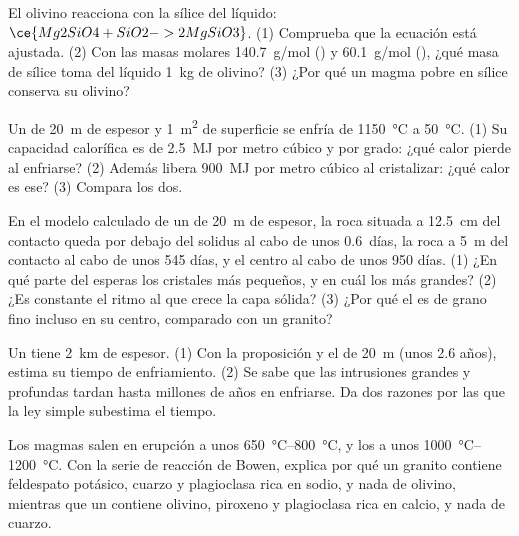 \begin{exercise}[$\star\star$]\label{exo:g11:igneous-rocks:10}
El olivino reacciona con la sílice del líquido: $\ce{Mg2SiO4 + SiO2 -> 2
MgSiO3}$. (1) Comprueba que la ecuación está ajustada. (2) Con las masas
molares \qty{140.7}{g/mol} () y \qty{60.1}{g/mol} (),
¿qué masa de sílice toma del líquido \qty{1}{kg} de olivino? (3) ¿Por qué un
magma pobre en sílice conserva su olivino?
\end{exercise}

\begin{exercise}[$\star\star$]\label{exo:g11:igneous-rocks:11}
Un  de \qty{20}{m} de espesor y \qty{1}{m^2} de superficie se enfría
de \qty{1150}{\degreeCelsius} a \qty{50}{\degreeCelsius}. (1) Su capacidad
calorífica es de \qty{2.5}{MJ} por metro cúbico y por grado: ¿qué calor pierde
al enfriarse? (2) Además libera \qty{900}{MJ} por metro cúbico al
cristalizar: ¿qué calor es ese? (3) Compara los dos.
\end{exercise}

\begin{exercise}[$\star\star\star$]\label{exo:g11:igneous-rocks:12}
En el modelo calculado de un  de \qty{20}{m} de espesor, la roca
situada a \qty{12.5}{cm} del contacto queda por debajo del solidus al cabo de
unos \num{0.6}~días, la roca a \qty{5}{m} del contacto al cabo de unos 545
días, y el centro al cabo de unos 950 días. (1) ¿En qué parte del 
esperas los cristales más pequeños, y en cuál los más grandes? (2) ¿Es
constante el ritmo al que crece la capa sólida? (3) ¿Por qué el  es
de grano fino incluso en su centro, comparado con un granito?
\end{exercise}

\begin{exercise}[$\star\star\star$]\label{exo:g11:igneous-rocks:13}
Un  tiene \qty{2}{km} de espesor. (1) Con la proposición y el 
de \qty{20}{m} (unos 2.6 años), estima su tiempo de enfriamiento. (2) Se sabe
que las intrusiones grandes y profundas tardan hasta millones de años en
enfriarse. Da dos razones por las que la ley simple subestima el tiempo.
\end{exercise}

\begin{exercise}[$\star\star\star$]\label{exo:g11:igneous-rocks:14}
Los magmas  salen en erupción a unos
\qtyrange{650}{800}{\degreeCelsius}, y los  a unos
\qtyrange{1000}{1200}{\degreeCelsius}. Con la serie de reacción de Bowen,
explica por qué un granito contiene feldespato potásico, cuarzo y plagioclasa
rica en sodio, y nada de olivino, mientras que un  contiene olivino,
piroxeno y plagioclasa rica en calcio, y nada de cuarzo.
\end{exercise}

